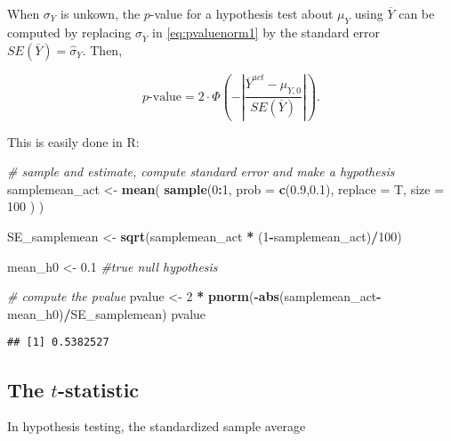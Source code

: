 \documentclass[]{book}
\newenvironment{Shaded}{\begin{snugshade}}{\end{snugshade}}
\newcommand{\KeywordTok}[1]{\textcolor[rgb]{0.13,0.29,0.53}{\textbf{#1}}}
\newcommand{\DataTypeTok}[1]{\textcolor[rgb]{0.13,0.29,0.53}{#1}}
\newcommand{\DecValTok}[1]{\textcolor[rgb]{0.00,0.00,0.81}{#1}}
\newcommand{\FloatTok}[1]{\textcolor[rgb]{0.00,0.00,0.81}{#1}}
\newcommand{\StringTok}[1]{\textcolor[rgb]{0.31,0.60,0.02}{#1}}
\newcommand{\CommentTok}[1]{\textcolor[rgb]{0.56,0.35,0.01}{\textit{#1}}}
\newcommand{\OperatorTok}[1]{\textcolor[rgb]{0.81,0.36,0.00}{\textbf{#1}}}
\newcommand{\NormalTok}[1]{#1}
\theoremstyle{definition}
\theoremstyle{definition}
\theoremstyle{definition}
\theoremstyle{remark}
\begin{document}
When \(\sigma_Y\) is unkown, the \(p\)-value for a hypothesis test about
\(\mu_Y\) using \(\overline{Y}\) can be computed by replacing
\(\sigma_{\overline{Y}}\) in \eqref{eq:pvaluenorm1} by the standard error
\(SE(\overline{Y}) = \hat\sigma_Y\). Then,

\[ p\text{-value} = 2\cdot\Phi\left(-\left\lvert \frac{\overline{Y}^{act}-\mu_{Y,0}}{SE(\overline{Y})} \right\rvert \right). \]

This is easily done in R:

\begin{Shaded}
\begin{Highlighting}[]
\CommentTok{# sample and estimate, compute standard error and make a hypothesis}
\NormalTok{samplemean_act <-}\StringTok{ }\KeywordTok{mean}\NormalTok{(}
  \KeywordTok{sample}\NormalTok{(}\DecValTok{0}\OperatorTok{:}\DecValTok{1}\NormalTok{, }
         \DataTypeTok{prob =} \KeywordTok{c}\NormalTok{(}\FloatTok{0.9}\NormalTok{,}\FloatTok{0.1}\NormalTok{), }
         \DataTypeTok{replace =}\NormalTok{ T, }
         \DataTypeTok{size =} \DecValTok{100}
\NormalTok{         )}
\NormalTok{  )}

\NormalTok{SE_samplemean <-}\StringTok{ }\KeywordTok{sqrt}\NormalTok{(samplemean_act }\OperatorTok{*}\StringTok{ }\NormalTok{(}\DecValTok{1}\OperatorTok{-}\NormalTok{samplemean_act)}\OperatorTok{/}\DecValTok{100}\NormalTok{)}

\NormalTok{mean_h0 <-}\StringTok{ }\FloatTok{0.1} \CommentTok{#true null hypothesis}

\CommentTok{# compute the pvalue}
\NormalTok{pvalue <-}\StringTok{ }\DecValTok{2} \OperatorTok{*}\StringTok{ }\KeywordTok{pnorm}\NormalTok{(}\OperatorTok{-}\KeywordTok{abs}\NormalTok{(samplemean_act}\OperatorTok{-}\NormalTok{mean_h0)}\OperatorTok{/}\NormalTok{SE_samplemean)}
\NormalTok{pvalue}
\end{Highlighting}
\end{Shaded}

\begin{verbatim}
## [1] 0.5382527
\end{verbatim}

\subsection*{\texorpdfstring{The
\(t\)-statistic}{The t-statistic}}\label{the-t-statistic}

In hypothesis testing, the standardized sample average
\end{document}
